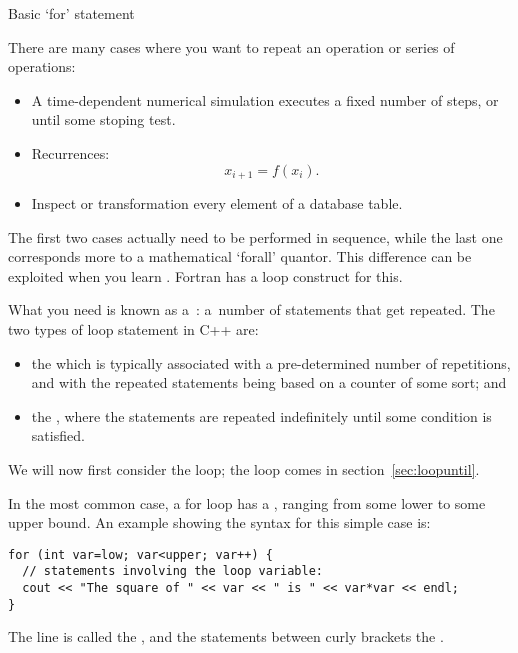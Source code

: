 
 {Basic `for' statement}
\label{sec:for}

There are many cases where you want to repeat an operation or series
of operations:
\begin{itemize}
\item A time-dependent numerical simulation executes a fixed number of
  steps, or until some stoping test.
\item Recurrences: \[ x_{i+1} = f(x_i). \]
\item Inspect or transformation every element of a database table.
\end{itemize}

\begin{remark}
  The first two cases actually need to be performed in
  sequence, while the last one corresponds more to a mathematical
  `forall' quantor. This difference can be exploited when you learn
  . Fortran has a
   loop construct for this.
\end{remark}

What you need is known as a~: a~number of
statements that get repeated. The two types of loop statement in C++ are:
\begin{itemize}
\item the  which is typically associated with
  a pre-determined number of repetitions, and with the repeated
  statements being based on a counter of some sort; and
\item the , where the statements are
  repeated indefinitely until some condition is satisfied.
\end{itemize}
We will now first consider the  loop; the  loop comes in
section~\ref{sec:loopuntil}.

In the most common case, a for loop has a
, ranging from some lower to some upper
bound. An example showing the syntax for this simple case is:
\begin{verbatim}
for (int var=low; var<upper; var++) {
  // statements involving the loop variable:
  cout << "The square of " << var << " is " << var*var << endl;
}
\end{verbatim}
The  line is called the , and the
statements between curly brackets the .

